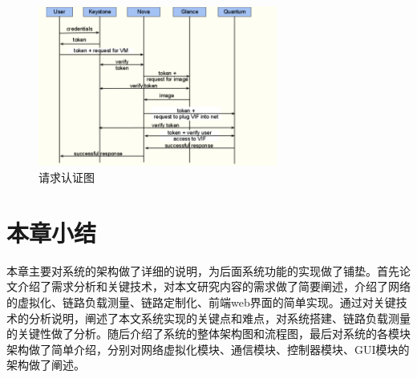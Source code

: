 \begin{figure}[!htb]
  \centering
  \includegraphics[width=0.7\textwidth]{logo/credentials.png}
  \caption{请求认证图}
  \label{fig:credentials}
\end{figure}

\section{本章小结}
本章主要对系统的架构做了详细的说明，为后面系统功能的实现做了铺垫。首先论文介绍了需求分析和关键技术，对本文研究内容的需求做了简要阐述，介绍了网络的虚拟化、链路负载测量、链路定制化、前端web界面的简单实现。通过对关键技术的分析说明，阐述了本文系统实现的关键点和难点，对系统搭建、链路负载测量的关键性做了分析。随后介绍了系统的整体架构图和流程图，最后对系统的各模块架构做了简单介绍，分别对网络虚拟化模块、通信模块、控制器模块、GUI模块的架构做了阐述。